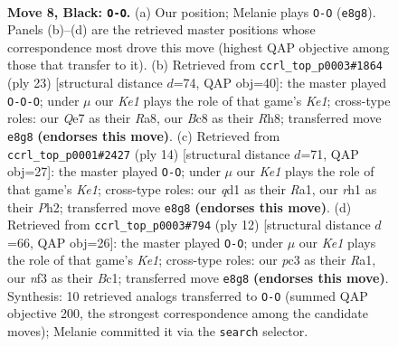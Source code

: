 \documentclass[11pt]{article}
\begin{document}
\begin{figure}[p]\centering
\begin{subfigure}{0.46\textwidth}\centering
\resizebox{\linewidth}{!}{%
\newchessgame
\chessboard[
  setfen={r1b1k2r/ppppqpp1/2n1pn1p/8/2PP3P/2P2NP1/P2BPP2/R2QKB1R b KQkq - 0 8},
  showmover=false,
  pgfstyle=straightmove, color=movearrow, markmove={e8-g8}
]}
\caption{}
\end{subfigure}\hfill
\begin{subfigure}{0.46\textwidth}\centering
\resizebox{\linewidth}{!}{%
\newchessgame
\chessboard[
  setfen={r3k2r/pbp1qp2/1pnppn1p/6p1/2PPP3/2P2P2/P2N1BPP/R2QKB1R b KQkq - 0 12},
  showmover=false,
  pgfstyle=straightmove, color=movearrow, markmove={e8-c8}
]}
\caption{}
\end{subfigure}
\\[4pt]
\begin{subfigure}{0.46\textwidth}\centering
\resizebox{\linewidth}{!}{%
\newchessgame
\chessboard[
  setfen={r1bqkb1r/p4ppp/2p1pn2/2pp4/4PP2/2NP1N2/PPP3PP/R1BQK2R w KQkq - 0 8},
  showmover=false,
  pgfstyle=straightmove, color=movearrow, markmove={e1-g1}
]}
\caption{}
\end{subfigure}\hfill
\begin{subfigure}{0.46\textwidth}\centering
\resizebox{\linewidth}{!}{%
\newchessgame
\chessboard[
  setfen={r1bqk2r/pp2bppp/2np1n2/2p1p3/2P5/2NP1NP1/PP2PPBP/R1BQK2R w KQkq - 2 7},
  showmover=false,
  pgfstyle=straightmove, color=movearrow, markmove={e1-g1}
]}
\caption{}
\end{subfigure}
\caption{\textbf{Move 8, Black: \texttt{O-O}.} (a) Our position; Melanie plays \texttt{O-O} (\texttt{e8g8}). Panels (b)--(d) are the retrieved master positions whose correspondence most drove this move (highest QAP objective among those that transfer to it). (b) Retrieved from \texttt{ccrl\_top\_p0003\#1864} (ply 23) [structural distance $d$=74, QAP obj=40]: the master played \texttt{O-O-O}; under $\mu$ our \emph{Ke1} plays the role of that game's \emph{Ke1}; cross-type roles: our \emph{Q}e7 as their \emph{R}a8, our \emph{B}c8 as their \emph{R}h8; transferred move \texttt{e8g8} \textbf{(endorses this move)}. (c) Retrieved from \texttt{ccrl\_top\_p0001\#2427} (ply 14) [structural distance $d$=71, QAP obj=27]: the master played \texttt{O-O}; under $\mu$ our \emph{Ke1} plays the role of that game's \emph{Ke1}; cross-type roles: our \emph{q}d1 as their \emph{R}a1, our \emph{r}h1 as their \emph{P}h2; transferred move \texttt{e8g8} \textbf{(endorses this move)}. (d) Retrieved from \texttt{ccrl\_top\_p0003\#794} (ply 12) [structural distance $d$=66, QAP obj=26]: the master played \texttt{O-O}; under $\mu$ our \emph{Ke1} plays the role of that game's \emph{Ke1}; cross-type roles: our \emph{p}c3 as their \emph{R}a1, our \emph{n}f3 as their \emph{B}c1; transferred move \texttt{e8g8} \textbf{(endorses this move)}. Synthesis: 10 retrieved analogs transferred to \texttt{O-O} (summed QAP objective 200, the strongest correspondence among the candidate moves); Melanie committed it via the \texttt{search} selector.}
\label{fig:thought-m15}
\end{figure}
\end{document}
